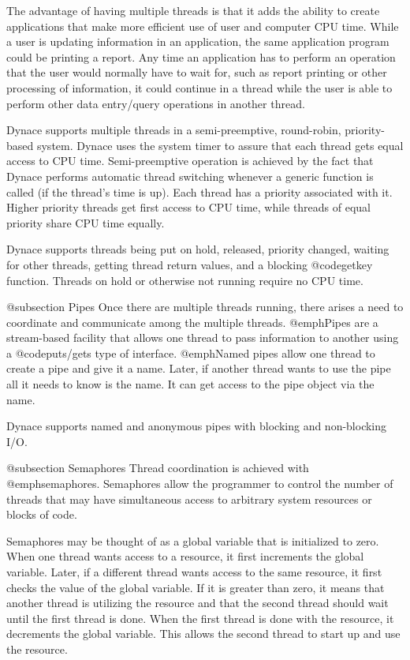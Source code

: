 The advantage of having multiple threads is that it adds the ability to
create applications that make more efficient use of user and computer
CPU time.  While a user is updating information in an application, the
same application program could be printing a report.  Any time an
application has to perform an operation that the user would normally
have to wait for, such as report printing or other processing of
information, it could continue in a thread while the user is able to
perform other data entry/query operations in another thread.

Dynace supports multiple threads in a semi-preemptive, round-robin,
priority-based system.  Dynace uses the system timer to assure that
each thread gets equal access to CPU time.  Semi-preemptive operation
is achieved by the fact that Dynace performs automatic thread
switching whenever a generic function is called (if the thread's time
is up).  Each thread has a priority associated with it.  Higher
priority threads get first access to CPU time, while threads of equal
priority share CPU time equally.

Dynace supports threads being put on hold, released, priority changed,
waiting for other threads, getting thread return values, and a
blocking @code{getkey} function.  Threads on hold or otherwise not
running require no CPU time.

@subsection Pipes
Once there are multiple threads running, there arises a need to coordinate
and communicate among the multiple threads.  @emph{Pipes} are a
stream-based facility that allows one thread to pass information
to another using a @code{puts/gets} type of interface.  @emph{Named pipes}
allow one thread to create a pipe and give it a name.  Later, if another
thread wants to use the pipe all it needs to know is the name.  It can
get access to the pipe object via the name.

Dynace supports named and anonymous pipes with blocking and non-blocking
I/O.

@subsection Semaphores
Thread coordination is achieved with @emph{semaphores}.  Semaphores allow
the programmer to control the number of threads that may have simultaneous
access to arbitrary system resources or blocks of code.

Semaphores may be thought of as a global variable that is initialized
to zero.  When one thread wants access to a resource, it first increments
the global variable.  Later, if a different thread wants access to the
same resource, it first checks the value of the global variable.  If it
is greater than zero, it means that another thread is utilizing the
resource and that the second thread should wait until the first thread is
done.  When the first thread is done with the resource, it decrements the
global variable.  This allows the second thread to start up and use
the resource.

